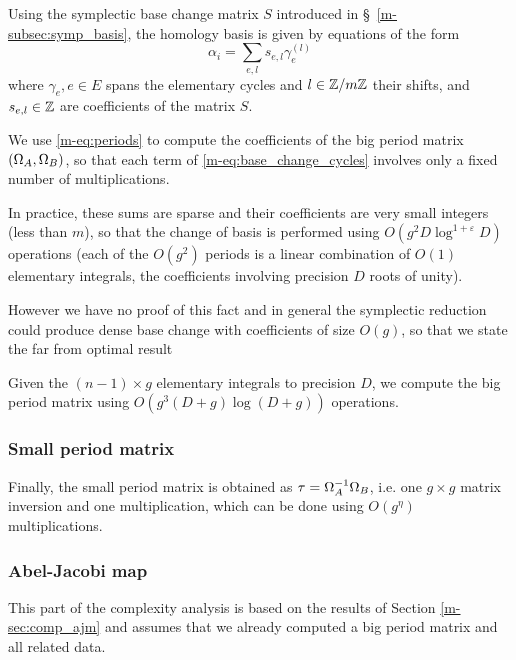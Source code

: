 \documentclass[main.tex]{subfiles}
\begin{document}
   Using the symplectic base change matrix $S$ introduced
   in \S~\ref{m-subsec:symp_basis}, the homology basis is given
   by equations of the form
   \begin{equation}
       \label{eq:base_change_cycles}
       \alpha_i = \sum_{e,l} s_{e,l}\gamma_e^{(l)}
   \end{equation}
   where $\gamma_e,e\in E$ spans the elementary cycles
   and $l\in\mathbb{Z}/m\mathbb{Z}$ their shifts,
   and $s_{e,l}\in\mathbb{Z}$ are coefficients of the matrix $S$. 

   We use \eqref{m-eq:periods} to compute the coefficients of the big period
   matrix $(\Omega_A,\Omega_B)$, so that each term of \eqref{m-eq:base_change_cycles}
   involves only a fixed number of multiplications.

   In practice, these sums are sparse and their coefficients are very small integers
   (less than $m$), so that the change of basis is performed using
   $O(g^2D\log^{1+\varepsilon}D)$ operations
   (each of the $O(g^2)$ periods is a linear combination of $O(1)$ elementary integrals,
   the coefficients involving precision $D$ roots of unity).

   However we have no proof of this fact and in general the symplectic reduction
   could produce dense base change with coefficients of size $O(g)$,
   so that we state the far from optimal result
   \begin{thm}
       Given the $(n-1)\times g$ elementary integrals to precision $D$,
       we compute the big period matrix using $O(g^3(D+g)\log(D+g))$ operations.
   \end{thm}

   \subsubsection{Small period matrix}

   Finally, the small period matrix is obtained as $\tau=\Omega_A^{-1}\Omega_B$,
   i.e. one $g\times g$ matrix inversion and one multiplication, which
   can be done using $O(g^{\eta})$ multiplications.
   
   \subsubsection{Abel-Jacobi map}
   
  This part of the complexity analysis is based on the results of Section \ref{m-sec:comp_ajm} and assumes that we already computed a big period matrix and all related data.
   
\end{document}

